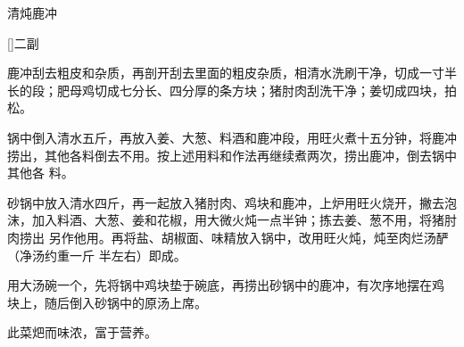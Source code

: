 %
%
%
%
%
%
%
\begin{recipe}{清炖鹿冲}

\ingredients

[\footnotemark]{二副}

\preparation

\step 鹿冲刮去粗皮和杂质，再剖开刮去里面的粗皮杂质，相清水洗刷干净，切成一寸半
长的段；肥母鸡切成七分长、四分厚的条方块；猪肘肉刮洗干净；姜切成四块，拍松。

\step 锅中倒入清水五斤，再放入姜、大葱、料酒和鹿冲段，用旺火煮十五分钟，将鹿冲
捞出，其他各料倒去不用。按上述用料和作法再继续煮两次，捞出鹿冲，倒去锅中其他各
料。

\step 砂锅中放入清水四斤，再一起放入猪肘肉、鸡块和鹿冲，上炉用旺火烧开，撇去泡
沫，加入料酒、大葱、姜和花椒，用大微火炖一点半钟；拣去姜、葱不用，将猪肘肉捞出
另作他用。再将盐、胡椒面、味精放入锅中，改用旺火炖，炖至肉烂汤酽（净汤约重一斤
半左右）即成。

\step 用大汤碗一个，先将锅中鸡块垫于碗底，再捞出砂锅中的鹿冲，有次序地摆在鸡
块上，随后倒入砂锅中的原汤上席。

\features

此菜𤆵而味浓，富于营养。


\end{recipe}

